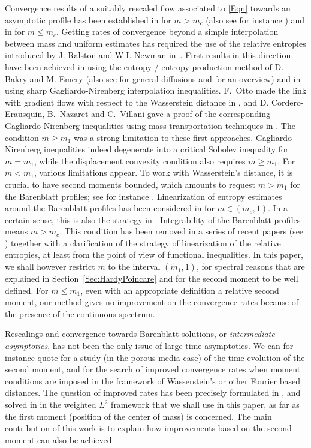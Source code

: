 \medskip Convergence results of a suitably rescaled flow associated to \eqref{Eqn}
 towards an asymptotic profile has been established in \cite{MR586735} for $m>m_c$
 (also see for instance \cite{MR1977429}) and in \cite{BBDGV,Daskalopoulos-Sesum2006}
  for $m\le m_c$.
Getting rates of convergence beyond a simple interpolation between mass and uniform estimates has required the use of the relative entropies
introduced by J. Ralston and W.I. Newman in~\cite{MR760591,MR760592}. First results in this direction have been achieved in \cite{MR1777035} using
the entropy / entropy-production method of D. Bakry and M. Emery (also see \cite{MR1853037} for general diffusions and \cite{MR2065020} for an
overview) and in \cite{MR1940370} using sharp Gagliardo-Nirenberg interpolation inequalities. F.~Otto made the link with gradient flows with
respect to the Wasserstein distance in \cite{MR1842429}, and D. Cordero-Erausquin, B.~Nazaret and C.~Villani gave a proof of the corresponding
Gagliardo-Nirenberg inequalities using mass transportation techniques in \cite{MR2032031}. The condition $m\ge m_1$ was a strong limitation to
these first approaches. Gagliardo-Nirenberg inequalities indeed degenerate
into a critical Sobolev inequality for $m=m_1$, while the displacement convexity condition also requires $m\ge m_1$. For $m<m_1$, various
limitations appear. To work with Wasserstein's distance, it is crucial to have second moments bounded, which amounts to request $m>\widetilde m_1$
for the Barenblatt profiles; see for instance \cite{MR1982656,MR2126633}. Linearization of entropy estimates around the Barenblatt profiles has
been considered in \cite{MR1901093,MR1974458} for $m\in(m_c,1)$. In a certain sense, this is also the strategy in \cite{MR1982656,MR2126633}.
Integrability of the Barenblatt profiles means $m>m_c$. This condition has been removed in a series of recent papers (see
\cite{BBDGV-CRAS,BBDGV,BDGV,BGV}) together with a clarification of the strategy of linearization of the relative entropies, at least from the
point of view of functional inequalities. In this paper, we shall however restrict $m$ to the interval $(\widetilde m_1,1)$, for spectral
reasons that are explained in Section~\ref{Sec:HardyPoincare} and for the second moment to be well defined. For $m\le\widetilde m_1$, even with an appropriate definition a relative second moment, our method gives no improvement on the convergence rates because of the presence of the continuous spectrum.

Rescalings and convergence towards Barenblatt solutions, or \emph{intermediate asymptotics}, has not been the only issue of large time
asymptotics. We can for instance quote \cite{MR2133441} for a study (in the porous media case) of the time evolution of the second moment, and
\cite{MR2255281,MR2126633,MR2211152,MR2344717} for the search of improved convergence rates when moment conditions are imposed in the framework of
Wasserstein's or other Fourier based distances. The question of improved rates has been precisely formulated in \cite{MR2126633}, and solved in
\cite{BDGV} in the weighted $L^2$ framework that we shall use in this paper, as far as the first moment (position of the center of mass) is
concerned. The main contribution of this work is to explain how improvements based on the second moment can also be achieved.

